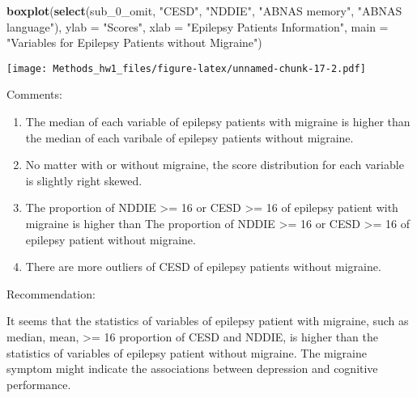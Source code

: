 \documentclass[]{article}
\newenvironment{Shaded}{\begin{snugshade}}{\end{snugshade}}
\newcommand{\KeywordTok}[1]{\textcolor[rgb]{0.13,0.29,0.53}{\textbf{#1}}}
\newcommand{\DataTypeTok}[1]{\textcolor[rgb]{0.13,0.29,0.53}{#1}}
\newcommand{\StringTok}[1]{\textcolor[rgb]{0.31,0.60,0.02}{#1}}
\newcommand{\NormalTok}[1]{#1}
\begin{document}
\begin{Shaded}
\begin{Highlighting}[]
\KeywordTok{boxplot}\NormalTok{(}\KeywordTok{select}\NormalTok{(sub_0_omit, }\StringTok{"CESD"}\NormalTok{, }\StringTok{"NDDIE"}\NormalTok{, }\StringTok{"ABNAS memory"}\NormalTok{, }\StringTok{"ABNAS language"}\NormalTok{), }\DataTypeTok{ylab =} \StringTok{"Scores"}\NormalTok{, }\DataTypeTok{xlab =} \StringTok{"Epilepsy Patients Information"}\NormalTok{, }\DataTypeTok{main =} \StringTok{"Variables for Epilepsy Patients without Migraine"}\NormalTok{)}
\end{Highlighting}
\end{Shaded}

\texttt{[image: Methods\_hw1\_files/figure-latex/unnamed-chunk-17-2.pdf]}

Comments:

\begin{enumerate}
\def\labelenumi{\arabic{enumi}.}
\item
  The median of each variable of epilepsy patients with migraine is
  higher than the median of each varibale of epilepsy patients without
  migraine.
\item
  No matter with or without migraine, the score distribution for each
  variable is slightly right skewed.
\item
  The proportion of NDDIE \textgreater{}= 16 or CESD \textgreater{}= 16
  of epilepsy patient with migraine is higher than The proportion of
  NDDIE \textgreater{}= 16 or CESD \textgreater{}= 16 of epilepsy
  patient without migraine.
\item
  There are more outliers of CESD of epilepsy patients without migraine.
\end{enumerate}

Recommendation:

It seems that the statistics of variables of epilepsy patient with
migraine, such as median, mean, \textgreater{}= 16 proportion of CESD
and NDDIE, is higher than the statistics of variables of epilepsy
patient without migraine. The migraine symptom might indicate the
associations between depression and cognitive performance.
\end{document}
